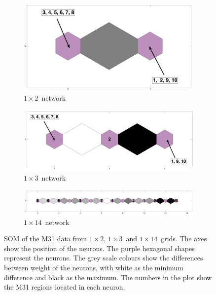     \begin{figure}
    \begin{subfigure}[b]{\textwidth}
        \centering
        \includegraphics[width=\textwidth]{../image_paper3/images0.01/M31/1D/combine_1D_1by2_all.png}
        \caption{$1\times2$~network}
    \label{fig: M31_net_1by2}
    \end{subfigure}
    \hfill
    \begin{subfigure}[b]{\textwidth}
        \includegraphics[width=\textwidth]{../image_paper3/images0.01/M31/1D/combine_1D_1by3_all.png}
         \caption{$1\times3$~network}
        \label{fig: M31_net_1by3}
    \end{subfigure}
    \hfill
    \begin{subfigure}[b]{\textwidth}
        \includegraphics[width=\textwidth]{../image_paper3/images0.01/M31/1D/combine_1D_1by14_all.png}
        \caption{$1\times14$~network}
        \label{fig: M31_net_1by14}
    \end{subfigure}
   \caption[One-dimensional self-organizing map of M31 data]{SOM of the M31 data from $1\times2$, $1\times3$~and $1\times14$~grids. The axes show the position of the neurons. The purple hexagonal shapes represent the neurons. The grey scale colours show the differences between weight of the neurons, with white as the minimum difference and black as the maximum. The numbers in the plot show the M31 regions located in each neuron.}
   \label{fig: M31_nets_1d}
    \end{figure}
    

